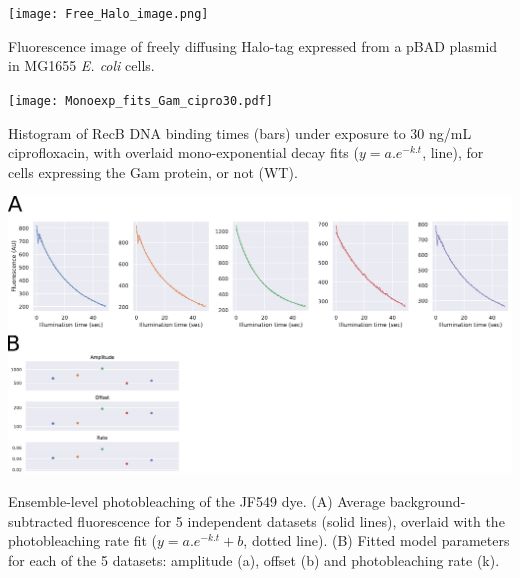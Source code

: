 
\begin{suppfigure*}[htbp]
\begin{center}
\texttt{[image: Free\_Halo\_image.png]}
\end{center}
\caption{Fluorescence image of freely diffusing Halo-tag expressed from a pBAD plasmid in MG1655 \textit{E. coli} cells.}
\label{SIFig:freehalo_image}
\end{suppfigure*}

\begin{suppfigure*}[htbp]
\begin{center}
\texttt{[image: Monoexp\_fits\_Gam\_cipro30.pdf]}
\end{center}
\caption{Histogram of RecB DNA binding times (bars) under exposure to 30 ng/mL ciprofloxacin, with overlaid mono-exponential decay fits ($y=a.e^{-k.t}$, line), for cells expressing the Gam protein, or not (WT).}
\label{SIFig:monoexp_fits}
\end{suppfigure*}


\begin{suppfigure*}[htbp]
\begin{center}
\includegraphics[width=\textwidth]{SI_Figures/SIFig_bleaching.pdf}
\end{center}
\caption{Ensemble-level photobleaching of the JF549 dye. (A) Average background-subtracted fluorescence for 5 independent datasets (solid lines), overlaid with the photobleaching rate fit ($y=a.e^{-k.t}+b$, dotted line). (B) Fitted model parameters for each of the 5 datasets: amplitude (a), offset (b) and photobleaching rate (k).}
\label{SIFig:dye_bleaching}
\end{suppfigure*}


